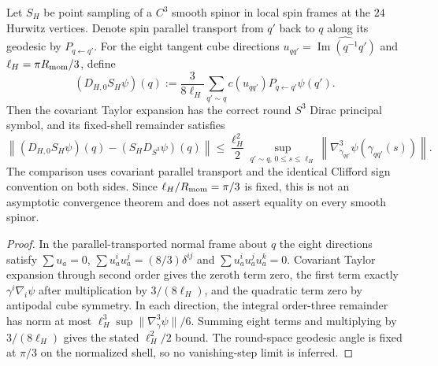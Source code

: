 \documentclass[12pt,a4paper]{article}
\begin{document}
\begin{theorem}
\label{p10:thm:hurwitz-shell-dirac-compression}
Let $S_H$ be point sampling of a $C^3$ smooth spinor in local spin frames at
the $24$ Hurwitz vertices.  Denote spin parallel transport from $q'$ back
to $q$ along its geodesic by $P_{q\leftarrow q'}$.  For the eight tangent
cube directions $u_{qq'}=\widehat{\operatorname{Im}(q^{-1}q')}$ and
$\ell_H=\pi R_{\rm mom}/3$, define
\begin{equation}
\label{p10:eq:hurwitz-dirac-compression}
(D_{H,0}S_H\psi)(q):=\frac{3}{8\ell_H}\sum_{q'\sim q}
 c(u_{qq'}) P_{q\leftarrow q'}\psi(q').
\end{equation}
Then the covariant Taylor expansion has the correct round $S^3$
Dirac principal symbol, and its fixed-shell remainder satisfies
\begin{equation}
\label{p10:eq:v350-spinorial-fixed-remainder}
\left\|(D_{H,0}S_H\psi)(q)-(S_HD_{S^3}\psi)(q)\right\|
 \le \frac{\ell_H^2}{2}
 \sup_{q'\sim q,\,0\le s\le\ell_H}
 \left\|\nabla_{\dot\gamma_{qq'}}^3\psi(\gamma_{qq'}(s))\right\|.
\end{equation}
The comparison uses covariant parallel transport and the identical
Clifford sign convention on both sides.  Since $\ell_H/R_{\rm mom}=\pi/3$
is fixed, this is not an asymptotic convergence theorem and does not
assert equality on every smooth spinor.
\end{theorem}
\begin{proof}
In the parallel-transported normal frame about $q$ the eight directions
satisfy $\sum u_a=0$, $\sum u_a^iu_a^j=(8/3)\delta^{ij}$ and
$\sum u_a^iu_a^ju_a^k=0$.  Covariant Taylor expansion through second
order gives the zeroth term zero, the first term exactly
$\gamma^i\nabla_i\psi$ after multiplication by $3/(8\ell_H)$, and the
quadratic term zero by antipodal cube symmetry.  In each direction,
the integral order-three remainder has norm at most
$\ell_H^3\sup\|\nabla_{\dot\gamma}^3\psi\|/6$.
Summing eight terms and multiplying by $3/(8\ell_H)$ gives the stated
$\ell_H^2/2$ bound.  The round-space geodesic angle is fixed at
$\pi/3$ on the normalized shell, so no vanishing-step limit is inferred.
\end{proof}
\end{document}
